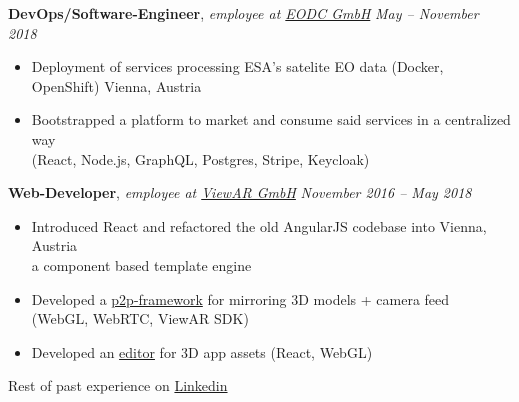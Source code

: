\documentclass[9pt]{extarticle}
\begin{document}
\noindent
{\bf DevOps/Software-Engineer}, \textit{employee at \href{https://eodc.eu}{EODC GmbH}}  \hfill \textit{May -- November 2018}
\begin{itemize}
\setlength\itemsep{0.05em}
    \item Deployment of services processing ESA's satelite EO data (Docker, OpenShift) \hfill Vienna, Austria
    \item Bootstrapped a platform to market and consume said services in a centralized way \\
    (React, Node.js, GraphQL, Postgres, Stripe, Keycloak) \\
\end{itemize}

\noindent
{\bf Web-Developer}, \textit{employee at \href{https://viewar.com}{ViewAR GmbH}}  \hfill \textit{November 2016 -- May 2018}
\begin{itemize}
\setlength\itemsep{0.05em}
    \item Introduced React and refactored the old AngularJS codebase into \hfill Vienna, Austria \\
    a component based template engine
    \item Developed a \href{https://www.youtube.com/watch?v=0j-v-j9xEUQ}{p2p-framework} for mirroring 3D models + camera feed \\
    (WebGL, WebRTC, ViewAR SDK)
    \item Developed an \href{https://www.youtube.com/watch?v=quE-erJ4PmU&t=113s}{editor} for 3D app assets (React, WebGL) \\
\end{itemize}

\noindent
Rest of past experience on \href{https://linkedin.com/in/matthias-klan}{Linkedin} \\


\end{document}
